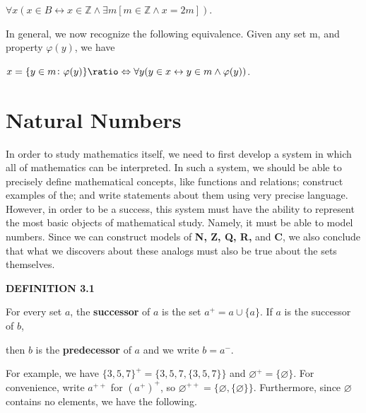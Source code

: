 \documentclass[12pt, a4paper]{article}
\newcommand*{\logeq}{\ratio\Leftrightarrow}
\begin{document}
\vspace{4mm}

\centerline{$\forall x(x\in B\leftrightarrow x\in\mathbb{Z}\wedge\exists m[m\in\mathbb{Z}\wedge x=2m])$.}

\vspace{4mm}

\noindent In general, we now recognize the following equivalence. Given any set m, and property $\varphi(y)$, we have\par

\vspace{4mm}

\centerline{$x=\{y\in m\colon\varphi(y)\}\logeq\forall y(y\in x\leftrightarrow y\in m\wedge\varphi(y))$.}


\newpage

\section{Natural Numbers}

\noindent In order to study mathematics itself, we need to first develop a system in which all of mathematics can be interpreted. In such a system, we should be able to precisely define mathematical concepts, like functions and relations; construct examples of the; and write statements about them using very precise language. However, in order to be a success, this system must have the ability to represent the most basic objects of mathematical study. Namely, it must be able to model numbers. Since we can construct models of \textbf{N, Z, Q, R,} and \textbf{C}, we also conclude that what we discovers about these analogs must also be true about the sets themselves.\par

\vspace{4mm}

\noindent\blacksquare\textbf{ DEFINITION 3.1}\par

\vspace{4mm}

For every set $a$, the \textbf{successor} of $a$ is the set $a^+=a\cup\{a\}$. If $a$ is the successor of $b$,\par then $b$ is the \textbf{predecessor} of $a$ and we write $b=a^-$.\par

\vspace{4mm}

\noindent For example, we have $\{3,5,7\}^+=\{3,5,7,\{3,5,7\}\}$ and $\varnothing^+=\{\varnothing\}$. For convenience, write $a^{++}$ for $(a^+)^+$, so $\varnothing^{++}=\{\varnothing,\{\varnothing\}\}$. Furthermore, since $\varnothing$ contains no elements, we have the following.\par
\end{document}
